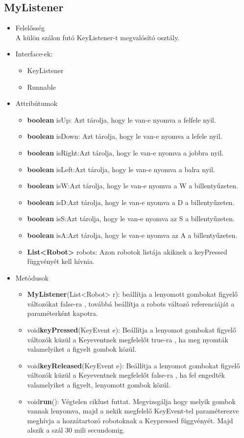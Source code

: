 \subsection{MyListener}
\begin{itemize}
\item Felelősség\\
A külön szálon futó KeyListener-t megvalósító osztály.
\item Interface-ek:\\
    \begin{itemize}
    \item KeyListener
    \item Runnable
    \end{itemize}
\item Attribútumok
	\begin{itemize}
		\item \textbf{boolean} isUp: Azt tárolja, hogy le van-e nyomva a felfele nyil.
    	\item \textbf{boolean} isDown: Azt tárolja, hogy le van-e nyomva a lefele nyil.
    	\item \textbf{boolean} isRight:Azt tárolja, hogy le van-e nyomva a jobbra nyil.
    	\item \textbf{boolean} isLeft:Azt tárolja, hogy le van-e nyomva a balra nyil.
    	\item \textbf{boolean} isW:Azt tárolja, hogy le van-e nyomva a W a billentyűzeten.
    	\item \textbf{boolean} isD:Azt tárolja, hogy le van-e nyomva a D a billentyűzeten.
    	\item \textbf{boolean} isS:Azt tárolja, hogy le van-e nyomva az S a billentyűzeten.
    	\item \textbf{boolean} isA:Azt tárolja, hogy le van-e nyomva az A a billentyűzeten.
   	\item \textbf{List<Robot>} robots: Azon robotok listája akiknek a keyPressed függvényét kell hívnia.
	
	
	\end{itemize}
\item Metódusok
	\begin{itemize}
		\item \textbf{MyListener}(List<Robot> r): beállítja a lenyomott gombokat figyelő változókat false-ra , továbbá beállítja a robots változó referenciáját a paraméterként kapotra.
			\item void\textbf{keyPressed}(KeyEvent e): Beállítja a lenyomot gombokat figyelő változók küzül a Keyeventnek megfelelőt  true-ra , ha meg nyomták valamelyiket  a figyelt gombok közül.
			\item void\textbf{keyReleased}(KeyEvent e): Beállítja a lenyomot gombokat figyelő változók küzül a Keyeventnek megfelelőt false-ra , ha fel engedték valamelyiket a figyelt, lenyomott gombok közül.
				\item void\textbf{run}(): Végtelen ciklust futtat. Megvizsgálja hogy melyik gombok vannak lenyomva, majd a nekik megfelelő KeyEvent-tel paraméterezve meghívja a hozzátartozó robotoknak a Keypressed függvényét. Majd alszik a szál 30 mili secundomig.
	\end{itemize}
\end{itemize}


